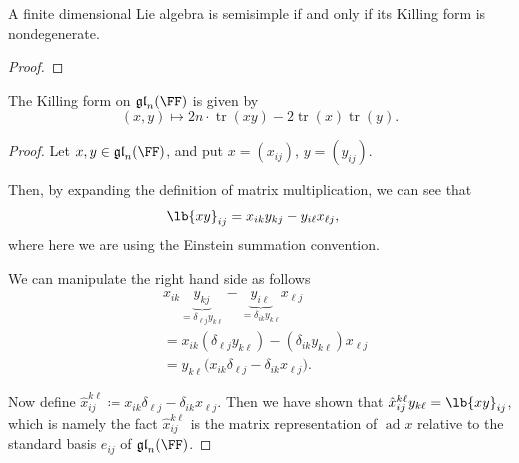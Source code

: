 \documentclass{article}
\DeclarePairedDelimiter\lb\lbrack\rbrack
\DeclareMathOperator{\tr}{tr}
\DeclareMathOperator{\ad}{ad}
\newcommand*\glalg{\ensuremath{\mathfrak{gl}}}
\begin{document}
\begin{proposition}
    A finite dimensional Lie algebra is semisimple if and only if its Killing form is nondegenerate.
\end{proposition}

\begin{proof}
\end{proof}

\begin{theorem}
    The Killing form on $\glalg_n(\FF)$ is given by
    \[
        (x, y)
        \mapsto
        2n\cdot\tr(xy) - 2\tr(x)\tr(y).
    \]
\end{theorem}
\begin{proof}
    Let $x, y \in \glalg_n(\FF)$, and put $x = (x_{ij})$, $y = (y_{ij})$.

    Then, by expanding the definition of matrix multiplication, we can see that
    \begin{align*}
        \lb{xy}_{ij}
        &=
        x_{ik}
        y_{kj}
        -
        y_{i\ell}x_{\ell j},
    \end{align*}
    where here we are using the Einstein summation convention.

    We can manipulate the right hand side as follows
    \begin{align*}
        &
        x_{ik}
        \underbrace{y_{kj}}_{=\delta_{\ell j}y_{k\ell}}
        -
        \underbrace{y_{i\ell}}_{=\delta_{ik}y_{k\ell}}
        x_{\ell j}
        \\
        &=
        x_{ik}
        (\delta_{\ell j}y_{k\ell})
        -
        (\delta_{ik}y_{k\ell})
        x_{\ell j}
        \\
        &=
        y_{k\ell}
        \Big(
            x_{ik}\delta_{\ell j}
            -
            \delta_{ik}x_{\ell j}
        \Big).
    \end{align*}

    Now define $\hat{x}_{ij}^{k\ell} \coloneq x_{ik}\delta_{\ell j} - \delta_{ik} x_{\ell j}$.
    Then we have shown that $\hat{x}_{ij}^{k\ell} y_{k\ell} = \lb{xy}_{ij}$, which is namely the fact $\hat{x}_{ij}^{k\ell}$ is the matrix representation of $\ad x$ relative to the standard basis $e_{ij}$ of $\glalg_n(\FF)$.


\end{proof}
\end{document}
